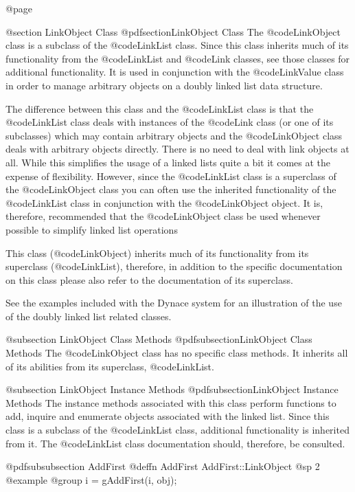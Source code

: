 @page

@section LinkObject Class
@pdfsection{LinkObject Class}
The @code{LinkObject} class is a subclass of the @code{LinkList} class.
Since this class inherits much of its functionality from the
@code{LinkList} and @code{Link} classes, see those classes for
additional functionality.  It is used in conjunction with the
@code{LinkValue} class in order to manage arbitrary objects on a doubly
linked list data structure.

The difference between this class and the @code{LinkList} class is that
the @code{LinkList} class deals with instances of the @code{Link} class
(or one of its subclasses) which may contain arbitrary objects and the
@code{LinkObject} class deals with arbitrary objects directly.  There is
no need to deal with link objects at all.  While this simplifies the
usage of a linked lists quite a bit it comes at the expense of
flexibility.  However, since the @code{LinkList} class is a superclass
of the @code{LinkObject} class you can often use the inherited
functionality of the @code{LinkList} class in conjunction with the
@code{LinkObject} object.  It is, therefore, recommended that the
@code{LinkObject} class be used whenever possible to simplify linked
list operations

This class (@code{LinkObject}) inherits much of its functionality from its
superclass (@code{LinkList}), therefore, in addition to the specific
documentation on this class please also refer to the documentation of
its superclass.

See the examples included with the Dynace system for an illustration of the
use of the doubly linked list related classes.



@subsection LinkObject Class Methods
@pdfsubsection{LinkObject Class Methods}
The @code{LinkObject} class has no specific class methods.  It inherits
all of its abilities from its superclass, @code{LinkList}.


@subsection LinkObject Instance Methods
@pdfsubsection{LinkObject Instance Methods}
The instance methods associated with this class perform functions to
add, inquire and enumerate objects associated with the linked list.
Since this class is a subclass of the @code{LinkList} class, additional
functionality is inherited from it.  The @code{LinkList} class
documentation should, therefore, be consulted.






@pdfsubsubsection {AddFirst}
@deffn {AddFirst} AddFirst::LinkObject
@sp 2
@example
@group
i = gAddFirst(i, obj);

